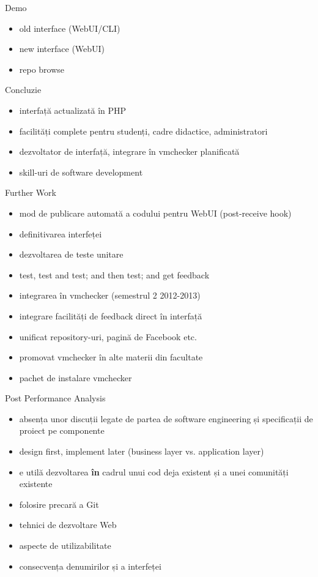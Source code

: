 \documentclass{beamer}
\begin{document}
\begin{frame}{Demo}
  \begin{itemize}
    \item old interface (WebUI/CLI)
    \item new interface (WebUI)
    \item repo browse
  \end{itemize}
\end{frame}

\begin{frame}{Concluzie}
  \begin{itemize}
    \item interfață actualizată în PHP
    \item facilități complete pentru studenți, cadre didactice, administratori
    \item dezvoltator de interfață, integrare în vmchecker planificată
    \item skill-uri de software development
  \end{itemize}
\end{frame}

\begin{frame}{Further Work}
  \begin{itemize}
    \item mod de publicare automată a codului pentru WebUI (post-receive hook)
    \item definitivarea interfeței
    \item dezvoltarea de teste unitare
    \item test, test and test; and then test; and get feedback
    \item integrarea în vmchecker (semestrul 2 2012-2013)
    \item integrare facilități de feedback direct în interfață
    \item unificat repository-uri, pagină de Facebook etc.
    \item promovat vmchecker în alte materii din facultate
    \item pachet de instalare vmchecker
  \end{itemize}
\end{frame}

\begin{frame}{Post Performance Analysis}
  \begin{itemize}
    \item absența unor discuții legate de partea de software engineering și
      specificații de proiect pe componente
    \item design first, implement later (business layer vs. application layer)
    \item e utilă dezvoltarea \textbf{în} cadrul unui cod deja existent și a
      unei comunități existente
    \item folosire precară a Git
    \item tehnici de dezvoltare Web
    \item aspecte de utilizabilitate
    \item consecvența denumirilor și a interfeței
  \end{itemize}
\end{frame}
\end{document}
